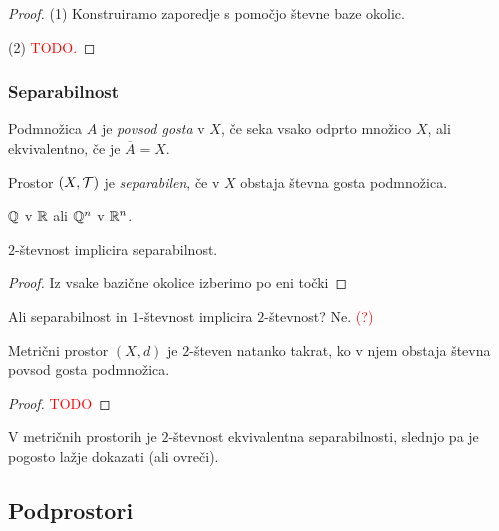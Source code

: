 \begin{proof}
    (1) Konstruiramo zaporedje s pomočjo števne baze okolic.

    (2) \textcolor{red}{TODO.}
\end{proof}

\newpage
\subsubsection{Separabilnost}
\begin{definicija}
    Podmnožica $A$ je \emph{povsod gosta} v $X$, če seka vsako odprto množico $X$, ali ekvivalentno, če je $\overline{A} = X$.
\end{definicija}

\begin{definicija}
    Prostor $(X, \mathcal{T})$ je \emph{separabilen}, če v $X$ obstaja števna gosta podmnožica.
\end{definicija}

\begin{primer}
    $\mathbb{Q}$ v $\mathbb{R}$ ali $\mathbb{Q}^n$ v $\mathbb{R}^n$.
\end{primer}

\begin{trditev}
    $2$-števnost implicira separabilnost.
\end{trditev}

\begin{proof}
    Iz vsake bazične okolice izberimo po eni točki
\end{proof}

\begin{opomba}
    Ali separabilnost in $1$-števnost implicira $2$-števnost? Ne. \textcolor{red}{(?)}
\end{opomba}

\begin{izrek}
    Metrični prostor $(X, d)$ je $2$-števen natanko takrat, ko v njem obstaja števna povsod gosta podmnožica.
\end{izrek}

\begin{proof}
    \textcolor{red}{TODO}
\end{proof}

\begin{opomba}
    V metričnih prostorih je $2$-števnost ekvivalentna separabilnosti, slednjo pa je pogosto lažje dokazati (ali ovreči).
\end{opomba}

\subsection{Podprostori}

